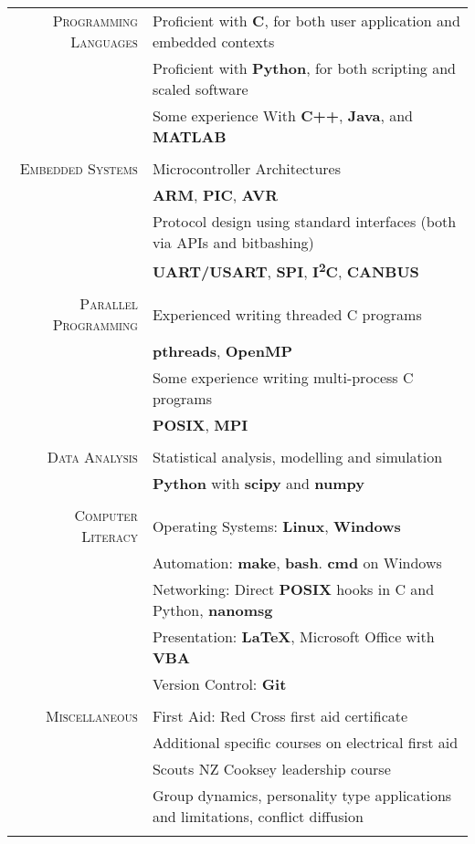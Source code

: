 \documentclass[a4paper,10pt]{article} %
\begin{document}
\begin{tabular}{r|l}
	
\textsc{Programming Languages} & Proficient with \textbf{C}, for both user application and embedded contexts \\ 
& Proficient with \textbf{Python}, for both scripting and scaled software \\
& Some experience With \textbf{C++}, \textbf{Java}, and \textbf{MATLAB} \\
\multicolumn{2}{c}{} \\

\textsc{Embedded Systems} & Microcontroller Architectures \\
& \quad \small{\textbf{ARM}, \textbf{PIC}, \textbf{AVR}} \\
& Protocol design using standard interfaces (both via APIs and bitbashing)  \\
& \quad \small{\textbf{UART/USART}, \textbf{SPI}, \textbf{I\textsuperscript{2}C}, \textbf{CANBUS}} \\
\multicolumn{2}{c}{} \\

\textsc{Parallel Programming} & Experienced writing threaded C programs \\
& \quad \small{\textbf{pthreads}, \textbf{OpenMP}} \\
& Some experience writing multi-process C programs \\
& \quad \small{\textbf{POSIX}, \textbf{MPI}} \\
\multicolumn{2}{c}{} \\

\textsc{Data Analysis} & Statistical analysis, modelling and simulation \\
& \textbf{Python} with \textbf{scipy} and \textbf{numpy} \\
\multicolumn{2}{c}{} \\

\textsc{Computer Literacy} & Operating Systems: \textbf{Linux}, \textbf{Windows} \\
& Automation: \textbf{make}, \textbf{bash}. \textbf{cmd} on Windows \\
& Networking: Direct \textbf{POSIX} hooks in C and Python, \textbf{nanomsg} \\
& Presentation: \textbf{\LaTeX}, Microsoft Office with \textbf{VBA} \\
& Version Control: \textbf{Git} \\
\multicolumn{2}{c}{} \\

\textsc{Miscellaneous} & First Aid: Red Cross first aid certificate \\
& \quad \small{Additional specific courses on electrical first aid} \\
& Scouts NZ Cooksey leadership course \\
& \quad \small{Group dynamics, personality type applications and limitations, conflict diffusion} \\
\multicolumn{2}{c}{} \\

\end{tabular}
\end{document}
